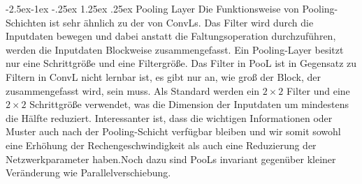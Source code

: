 \documentclass[12pt,a4paper]{scrartcl}
\makeatletter
\numberwithin{equation}{section}
\renewcommand\paragraph{\@startsection{paragraph}{4}{\z@}%
	{-2.5ex\@plus -1ex \@minus -.25ex}%
	{1.25ex \@plus .25ex}%
	{\normalfont\normalsize\bfseries}}
\makeatother
\begin{document}
\paragraph{Pooling Layer}\label{Pooling Layer}
Die Funktionsweise von Pooling-Schichten ist sehr ähnlich zu der von \acsp{ConvL}. Das Filter wird durch die Inputdaten bewegen und dabei anstatt die Faltungsoperation durchzuführen, werden die Inputdaten Blockweise zusammengefasst. Ein Pooling-Layer besitzt nur eine Schrittgröße und eine Filtergröße. Das Filter in PooL ist in Gegensatz zu Filtern in ConvL nicht lernbar ist, es gibt nur an, wie groß der Block, der zusammengefasst wird, sein muss.
Als Standard werden ein $ 2 \times 2 $ Filter und eine $ 2 \times 2 $ Schrittgröße verwendet, was die Dimension der Inputdaten um mindestens die Hälfte reduziert. Interessanter ist, dass die wichtigen Informationen oder Muster auch nach der Pooling-Schicht verfügbar bleiben und wir somit sowohl eine Erhöhung der Rechengeschwindigkeit als auch eine Reduzierung der Netzwerkparameter haben.Noch dazu sind \acsp{PooL}  invariant gegenüber kleiner Veränderung wie Parallelverschiebung.
\end{document}
